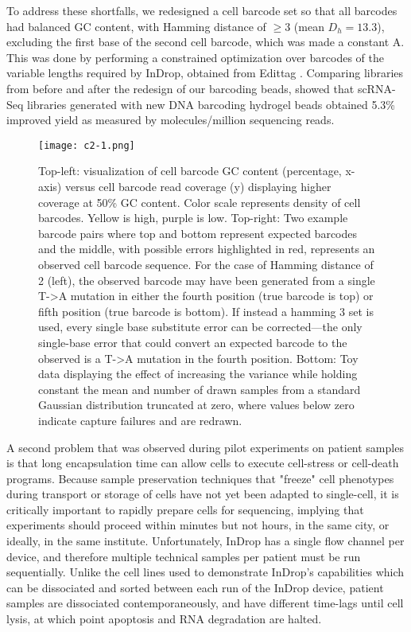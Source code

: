 To address these shortfalls, we redesigned a cell barcode set so that all barcodes had balanced GC content, with Hamming distance of $\ge3$ (mean $D_h = 13.3$), excluding the first base of the second cell barcode, which was made a constant A.
This was done by performing a constrained optimization over barcodes of the variable lengths required by InDrop, obtained from Edittag \citep{Faircloth2012}.
Comparing libraries from before and after the redesign of our barcoding beads, showed that scRNA-Seq libraries generated with new DNA barcoding hydrogel beads obtained 5.3\% improved yield as measured by molecules/million sequencing reads. 

\begin{figure} 
\centering
\texttt{[image: c2-1.png]} %
\caption{Top-left: visualization of cell barcode GC content (percentage, x-axis) versus cell barcode read coverage (y) displaying higher coverage at 50\% GC content. 
  Color scale represents density of cell barcodes. Yellow is high, purple is low.  
  Top-right: Two example barcode pairs where top and bottom represent expected barcodes and the middle, with possible errors highlighted in red, represents an observed cell barcode sequence. For the case of Hamming distance of 2 (left), the observed barcode may have been generated from a single T->A mutation in either the fourth position (true barcode is top) or fifth position (true barcode is bottom). If instead a hamming 3 set is used, every single base substitute error can be corrected---the only single-base error that could convert an expected barcode to the observed is a T->A mutation in the fourth position. Bottom: Toy data displaying the effect of increasing the variance while holding constant the mean and number of drawn samples from a standard Gaussian distribution truncated at zero, where values below zero indicate capture failures and are redrawn.}
\label{fig:c2-1}
\end{figure}

A second problem that was observed during pilot experiments on patient samples is that long encapsulation time can allow cells to execute cell-stress or cell-death programs.
Because sample preservation techniques that "freeze" cell phenotypes during transport or storage of cells have not yet been adapted to single-cell, it is critically important to rapidly prepare cells for sequencing, implying that experiments should proceed within minutes but not hours, in the same city, or ideally, in the same institute. 
Unfortunately, InDrop has a single flow channel per device, and therefore multiple technical samples per patient must be run sequentially. 
Unlike the cell lines used to demonstrate InDrop's capabilities which can be dissociated and sorted between each run of the InDrop device, patient samples are dissociated contemporaneously, and have different time-lags until cell lysis, at which point apoptosis and RNA degradation are halted.

